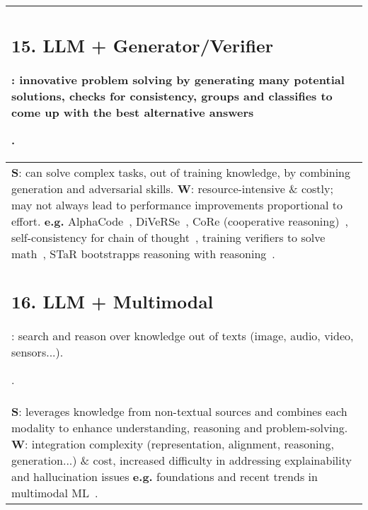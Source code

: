 \documentclass[acmsmall]{acmart}
\begin{document}
{\begin{longtable}{p{1\linewidth}}
{\subsection{15. LLM + Generator/Verifier}\label{HP15}:
innovative problem solving by generating many potential solutions, checks for consistency, groups and classifies to come up with the best alternative answers}. \\\midrule
{\textbf{S}: can solve complex tasks, out of training knowledge, by combining generation and adversarial skills.
 \newline \textbf{W}:} resource-intensive \& costly; may not always lead to performance improvements proportional to effort. \newline \textbf{e.g.} AlphaCode~\citep{liCompetitionLevelCodeGeneration2022}, DiVeRSe~\citep{liAdvanceMakingLanguage2022}, CoRe (cooperative reasoning)~\citep{zhuSolvingMathWord2022}, self-consistency for chain of thought~\citep{wangSelfConsistencyImprovesChain2022}, training verifiers to solve math~\citep{cobbeTrainingVerifiersSolve2021}, STaR bootstrapps reasoning with reasoning~\citep{zelikmanSTaRBootstrappingReasoning2022}. \\\midrule

{\subsection{16. LLM + Multimodal}\label{HP16}:
search and reason over knowledge out of texts (image, audio, video, sensors...).}. \\\midrule  
{\textbf{S}: leverages knowledge from non-textual sources and combines each modality to enhance understanding, reasoning and problem-solving.
 \newline \textbf{W}:} integration complexity (representation, alignment, reasoning, generation...) \& cost, increased difficulty in addressing explainability and hallucination issues
 \newline \textbf{e.g.} foundations and recent trends in multimodal ML~\citep{liangFoundationsRecentTrends2022, openaiGPT4TechnicalReport2023}. \\\midrule


\end{longtable}}
\end{document}
